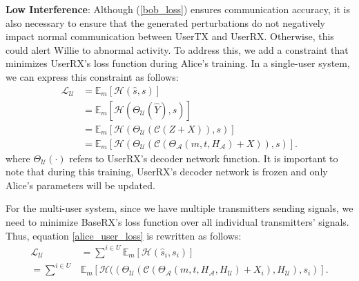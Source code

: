 
\textbf{Low Interference}: Although (\ref{bob_loss}) ensures communication accuracy, it is also necessary to ensure that the generated perturbations do not negatively impact normal communication between UserTX and UserRX. Otherwise, this could alert Willie to abnormal activity. To address this, we add a constraint that minimizes UserRX's loss function during Alice's training. In a single-user system, we can express this constraint as follows:
\begin{equation}
	\begin{aligned} \label{alice_user_loss}
	\mathcal{L}_{\mathcal{U}} & = \mathbb{E}_{m}[\mathcal{H}(\hat{s}, s)] \\
	& = \mathbb{E}_{m}[\mathcal{H}(\Theta_{\mathcal{U}}(\hat{Y}), s)] \\
	& = \mathbb{E}_{m}[\mathcal{H}(\Theta_{\mathcal{U}}(\mathcal{C}(Z + X)), s)] \\
	& = \mathbb{E}_{m}[\mathcal{H}(\Theta_{\mathcal{U}}(\mathcal{C}(\Theta_{\mathcal{A}}(m, t, H_{\mathcal{A}}) + X)), s)].
	\end{aligned}
\end{equation}
where \(\Theta_{\mathcal{U}}(\cdot)\) refers to UserRX's decoder network function. It is important to note that during this training, UserRX's decoder network is frozen and only Alice's parameters will be updated.

For the multi-user system, since we have multiple transmitters sending signals, we need to minimize BaseRX's loss function over all individual transmitters' signals. Thus, equation \ref{alice_user_loss} is rewritten as follows:
\begin{equation}
	\begin{aligned} \label{multi_alice_user_loss}
		\mathcal{L}_{\mathcal{U}} & = \sum^{i \in U}\mathbb{E}_{m}[\mathcal{H}(\hat{s}_i, s_i)] \\
		= \sum^{i \in U} & 
			\mathbb{E}_{m}[\mathcal{H}
			((\Theta_{\mathcal{U}}(\mathcal{C}(\Theta_{\mathcal{A}}(m, t, H_{\mathcal{A}}, H_{\mathcal{U}}) + X_i),  H_{\mathcal{U}}), s_i)].
	\end{aligned}
\end{equation}

